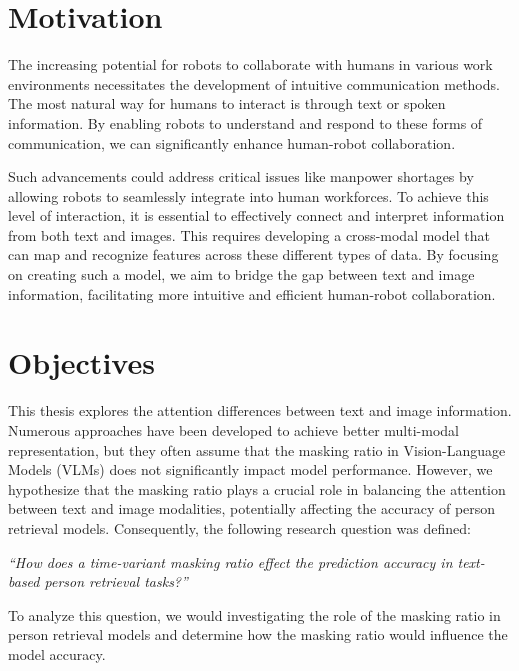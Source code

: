 \section{Motivation}
The increasing potential for robots to collaborate with humans in various work environments necessitates the development of intuitive communication methods. The most natural way for humans to interact is through text or spoken information. By enabling robots to understand and respond to these forms of communication, we can significantly enhance human-robot collaboration.

Such advancements could address critical issues like manpower shortages by allowing robots to seamlessly integrate into human workforces. To achieve this level of interaction, it is essential to effectively connect and interpret information from both text and images. This requires developing a cross-modal model that can map and recognize features across these different types of data. By focusing on creating such a model, we aim to bridge the gap between text and image information, facilitating more intuitive and efficient human-robot collaboration.

\section{Objectives}
This thesis explores the attention differences between text and image information. Numerous approaches have been developed to achieve better multi-modal representation, but they often assume that the masking ratio in Vision-Language Models (VLMs) does not significantly impact model performance. However, we hypothesize that the masking ratio plays a crucial role in balancing the attention between text and image modalities, potentially affecting the accuracy of person retrieval models. Consequently, the following research question was defined:

\bigskip
\textit{“How does a time-variant masking ratio effect the prediction accuracy in text-based person retrieval tasks?”}
\bigskip

To analyze this question, we would investigating the role of the masking ratio in person retrieval models and determine how the masking ratio would influence the model accuracy.



